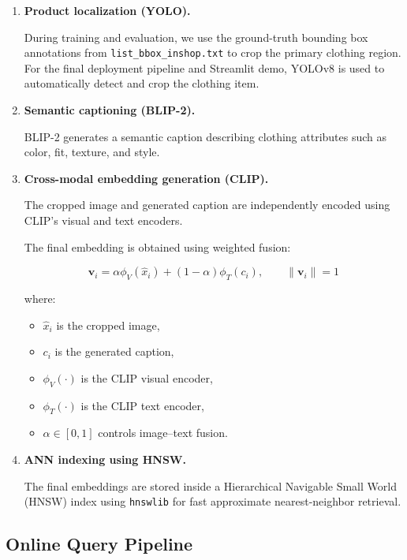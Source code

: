 \documentclass[12pt,a4paper]{article}
\begin{document}
\begin{enumerate}[noitemsep]
    \item \textbf{Product localization (YOLO).}

    During training and evaluation, we use the ground-truth bounding box
    annotations from \texttt{list\_bbox\_inshop.txt} to crop the primary
    clothing region.
    For the final deployment pipeline and Streamlit demo, 
    YOLOv8 is used to automatically detect and crop the clothing item.

    \item \textbf{Semantic captioning (BLIP-2).}

    BLIP-2 generates a semantic caption describing clothing attributes such
    as color, fit, texture, and style.

    \item \textbf{Cross-modal embedding generation (CLIP).}

    The cropped image and generated caption are independently encoded using
    CLIP's visual and text encoders.

    The final embedding is obtained using weighted fusion:

    \begin{equation}
        \mathbf{v}_i =
        \alpha \phi_V(\hat{x}_i)
        +
        (1-\alpha)\phi_T(c_i),
        \qquad
        \|\mathbf{v}_i\| = 1
    \end{equation}

    where:

    \begin{itemize}[noitemsep]
        \item $\hat{x}_i$ is the cropped image,
        \item $c_i$ is the generated caption,
        \item $\phi_V(\cdot)$ is the CLIP visual encoder,
        \item $\phi_T(\cdot)$ is the CLIP text encoder,
        \item $\alpha \in [0,1]$ controls image--text fusion.
    \end{itemize}

    \item \textbf{ANN indexing using HNSW.}

    The final embeddings are stored inside a Hierarchical Navigable Small World (HNSW) index using \texttt{hnswlib} for fast approximate nearest-neighbor retrieval.
\end{enumerate}

\subsection{Online Query Pipeline}
\end{document}
